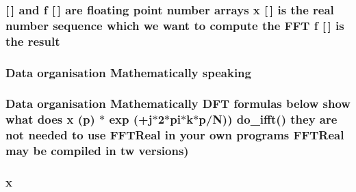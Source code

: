 \subsubsection[{\texorpdfstring{result}{result}}]{ \mbox{[}$\,$\mbox{]} and {\bf f} \mbox{[}$\,$\mbox{]} are floating point number arrays {\bf x} \mbox{[}$\,$\mbox{]} is the real number sequence which we want to compute the F\+FT {\bf f} \mbox{[}$\,$\mbox{]} is the result}\hypertarget{FFTReal__readme_8txt_af64dcf51fedf6a89308c7e46c0868511}{}\label{FFTReal__readme_8txt_af64dcf51fedf6a89308c7e46c0868511}
\subsubsection[{\texorpdfstring{speaking}{speaking}}]{\setlength{\rightskip}{0pt plus 5cm}Data organisation Mathematically speaking}\hypertarget{FFTReal__readme_8txt_a2c9b06685d7b48b69727762751de915d}{}\label{FFTReal__readme_8txt_a2c9b06685d7b48b69727762751de915d}
\subsubsection[{\texorpdfstring{versions}{versions}}]{\setlength{\rightskip}{0pt plus 5cm}Data organisation Mathematically D\+FT formulas {\bf below} show what does {\bf x} (p) $\ast$ exp (+j$\ast$2$\ast$pi$\ast$k$\ast$p/{\bf N})) {\bf do\+\_\+ifft}() they are not needed to use {\bf F\+F\+T\+Real} in your own programs {\bf F\+F\+T\+Real} may be compiled in tw versions) }\hypertarget{FFTReal__readme_8txt_a4c3ae4ba9b2751ae5f224f21fdfbb46d}{}\label{FFTReal__readme_8txt_a4c3ae4ba9b2751ae5f224f21fdfbb46d}
\subsubsection[{\texorpdfstring{x}{x}}]{\setlength{\rightskip}{0pt plus 5cm}x}\hypertarget{FFTReal__readme_8txt_a9c92ac89d1560f812393ca39a19e581e}{}\label{FFTReal__readme_8txt_a9c92ac89d1560f812393ca39a19e581e}
